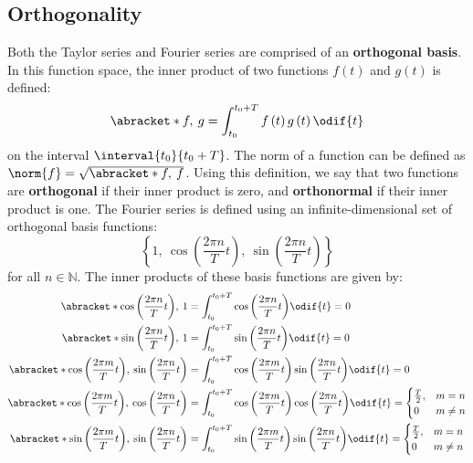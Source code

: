 \documentclass{article}
\begin{document}
\subsection{Orthogonality}
Both the Taylor series and Fourier series are comprised of an
\textbf{orthogonal basis}. In this function space, the inner product of
two functions \(f\left( t \right)\) and \(g\left( t \right)\) is
defined:
\begin{equation*}
    \abracket*{f,\: g} = \int_{t_0}^{t_0 + T} f\left( t \right) g\left( t \right) \odif{t}
\end{equation*}
on the interval \(\interval{t_0}{t_0 + T}\). The norm of a function can
be defined as \(\norm{f} = \sqrt{\abracket*{f,\: f}}\). Using this
definition, we say that two functions are \textbf{orthogonal} if their
inner product is zero, and \textbf{orthonormal} if their inner product
is one.
The Fourier series is defined using an infinite-dimensional set of
orthogonal basis functions:
\begin{equation*}
    \left\{ 1, \: \cos{\left( \frac{2\pi n}{T} t \right)}, \: \sin{\left( \frac{2\pi n}{T} t \right)} \right\}
\end{equation*}
for all \(n \in \mathbb{N}\). The inner products of these basis
functions are given by:
\begin{align*}
    \abracket*{\cos{\left( \frac{2\pi n}{T} t \right)},\: 1}                                       & = \int_{t_0}^{t_0 + T} \cos{\left( \frac{2\pi n}{T} t \right)} \odif{t} = 0                                         \\
    \abracket*{\sin{\left( \frac{2\pi n}{T} t \right)},\: 1}                                       & = \int_{t_0}^{t_0 + T} \sin{\left( \frac{2\pi n}{T} t \right)} \odif{t} = 0                                         \\
    \abracket*{\cos{\left( \frac{2\pi m}{T} t \right)},\: \sin{\left( \frac{2\pi n}{T} t \right)}} & = \int_{t_0}^{t_0 + T} \cos{\left( \frac{2\pi m}{T} t \right)} \sin{\left( \frac{2\pi n}{T} t \right)} \odif{t} = 0 \\
    \abracket*{\cos{\left( \frac{2\pi m}{T} t \right)},\: \cos{\left( \frac{2\pi n}{T} t \right)}} & =
    \int_{t_0}^{t_0 + T} \cos{\left( \frac{2\pi m}{T} t \right)} \cos{\left( \frac{2\pi n}{T} t \right)} \odif{t} =
    \begin{cases}
        \frac{T}{2}, & m = n    \\
        0            & m \neq n
    \end{cases}
    \\
    \abracket*{\sin{\left( \frac{2\pi m}{T} t \right)},\: \sin{\left( \frac{2\pi n}{T} t \right)}} & =
    \int_{t_0}^{t_0 + T} \sin{\left( \frac{2\pi m}{T} t \right)} \sin{\left( \frac{2\pi n}{T} t \right)} \odif{t} =
    \begin{cases}
        \frac{T}{2}, & m = n    \\
        0            & m \neq n
    \end{cases}
\end{align*}
\end{document}
